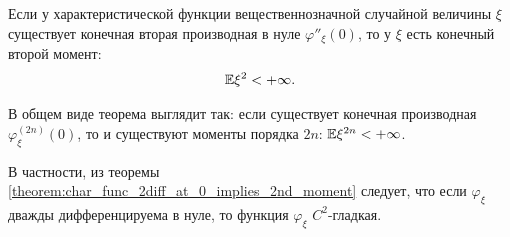\documentclass[../main.tex]{subfiles}
\begin{document}
\begin{thm}
 \label{theorem:char_func_2diff_at_0_implies_2nd_moment}
 Если у характеристической функции вещественнозначной случайной величины $ \xi $ существует конечная вторая производная в нуле $ \varphi''_\xi(0) $, то у $ \xi $ есть конечный второй момент:
 \begin{align*}
  \mathbb E\xi^{2} < +\infty.
 \end{align*}
\end{thm}
\begin{remrk}
 \label{remark:general_char_func_2n_diff_at_0_implies_2n_moment}
 В общем виде теорема выглядит так: если существует конечная производная $ \varphi^{(2n)}_\xi(0) $, то и существуют моменты порядка $ 2n $: $ \mathbb E\xi^{2n} < +\infty $.
\end{remrk}
\begin{remrk}
 В частности, из теоремы \ref{theorem:char_func_2diff_at_0_implies_2nd_moment} следует, что если $ \varphi_\xi $ дважды дифференцируема в нуле, то функция $ \varphi_\xi $ $ C^{2} $-гладкая.
\end{remrk}
\end{document}
